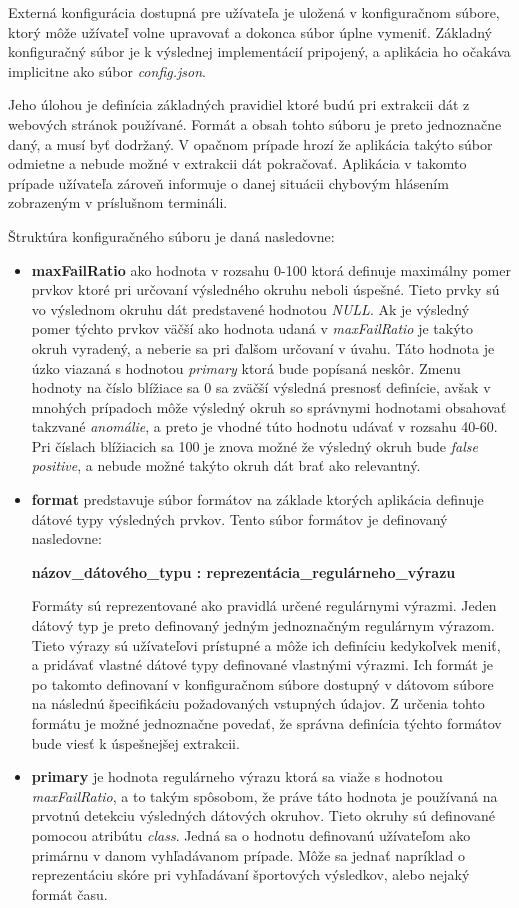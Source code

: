 Externá konfigurácia dostupná pre užívateľa je uložená v konfiguračnom súbore, ktorý môže užívateľ volne upravovať a dokonca súbor úplne vymeniť. Základný konfiguračný súbor je k výslednej implementácií pripojený, a aplikácia ho očakáva implicitne ako súbor \textit{config.json}.

Jeho úlohou je definícia základných pravidiel ktoré budú pri extrakcii dát z webových stránok používané. Formát a obsah tohto súboru je preto jednoznačne daný, a musí byť dodržaný. V opačnom prípade hrozí že aplikácia takýto súbor odmietne a nebude možné v extrakcii dát pokračovať. Aplikácia v takomto prípade užívateľa zároveň informuje o danej situácii chybovým hlásením zobrazeným v príslušnom termináli. 

Štruktúra konfiguračného súboru je daná nasledovne:

\begin{itemize}
  \item \textbf{maxFailRatio} ako hodnota v rozsahu 0-100 ktorá definuje maximálny pomer prvkov ktoré pri určovaní výsledného okruhu neboli úspešné. Tieto prvky sú vo výslednom okruhu dát predstavené hodnotou \textit{NULL}. Ak je výsledný pomer týchto prvkov väčší ako hodnota udaná v \textit{maxFailRatio} je takýto okruh vyradený, a neberie sa pri ďalšom určovaní v úvahu. Táto hodnota je úzko viazaná s hodnotou \textit{primary} ktorá bude popísaná neskôr. Zmenu hodnoty na číslo blížiace sa 0 sa zväčší výsledná presnosť definície, avšak v mnohých prípadoch môže výsledný okruh so správnymi hodnotami obsahovať takzvané \textit{anomálie}, a preto je vhodné túto hodnotu udávať v rozsahu 40-60. Pri číslach blížiacich sa 100 je znova možné že výsledný okruh bude \textit{false positive}, a nebude možné takýto okruh dát brať ako relevantný.
  \item \textbf{format} predstavuje súbor formátov na základe ktorých aplikácia definuje dátové typy výsledných prvkov. Tento súbor formátov je definovaný nasledovne:
  
  \textbf{názov\_dátového\_typu : reprezentácia\_regulárneho\_výrazu}
  
  Formáty sú reprezentované ako pravidlá určené regulárnymi výrazmi. Jeden  dátový typ je preto definovaný jedným jednoznačným regulárnym výrazom. Tieto výrazy sú užívateľovi prístupné a môže ich definíciu kedykoľvek meniť, a pridávať vlastné dátové typy definované vlastnými výrazmi. Ich formát je po takomto definovaní v konfiguračnom súbore dostupný v dátovom súbore na následnú špecifikáciu požadovaných vstupných údajov. Z určenia tohto formátu je možné jednoznačne povedať, že správna definícia týchto formátov bude viesť k úspešnejšej extrakcii. 
  
  \item \textbf{primary} je hodnota regulárneho výrazu ktorá sa viaže s hodnotou \textit{maxFailRatio}, a to takým spôsobom, že práve táto hodnota je používaná na prvotnú detekciu výsledných dátových okruhov. Tieto okruhy sú definované pomocou atribútu \textit{class}. Jedná sa o hodnotu definovanú užívateľom ako primárnu v danom vyhľadávanom prípade. Môže sa jednať napríklad o reprezentáciu skóre pri vyhľadávaní športových výsledkov, alebo nejaký formát času. 
\end{itemize}
